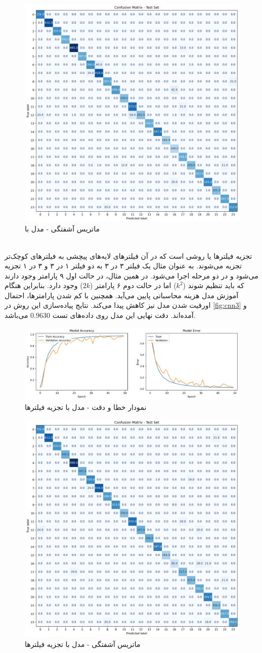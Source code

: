 \documentclass[11pt]{article}
\begin{document}
	\begin{figure}[!h]
		\centerline{\includegraphics[width=0.5\linewidth]{../HW3_2/cnn2 cm.png}}
		\caption{ماتریس آشفتگی - مدل  با }
		\label{fig:cnn2_cm} 
	\end{figure}\\
	تجزیه فیلتر‌ها یا  روشی است که در آن فیلتر‌های لایه‌های پیچشی به فیلتر‌های کوچک‌تر تجزیه می‌شوند. به عنوان مثال یک فیلتر ۳ در ۳ به دو فیلتر ۱ در ۳ و ۳ در ۱ تجزیه می‌شود و در دو مرحله اجرا می‌شود. در همین مثال، در حالت اول ۹ پارامتر وجود دارند که باید تنظیم شوند ($ k^2 $) اما در حالت دوم ۶ پارامتر ($2k$) وجود دارد. بنابراین هنگام آموزش مدل هزینه محاسباتی پایین می‌آید. همچنین با کم شدن پارامتر‌ها، احتمال اورفیت شدن مدل نیز کاهش پیدا می‌کند. نتایج پیاده‌سازی این روش در
	\autoref{fig:cnn3}
	و
	آمده‌اند. دقت نهایی این مدل روی داده‌های تست $0.9630$ می‌باشد.\\
		\begin{figure}[!h]
		\centerline{\includegraphics[width=1\linewidth]{../HW3_2/cnn3.png}}
		\caption{نمودار خطا و دقت  - مدل  با تجزیه فیلتر‌ها}
		\label{fig:cnn3}
	\end{figure}
	\begin{figure}[!h]
		\centerline{\includegraphics[width=0.5\linewidth]{../HW3_2/cnn3 cm.png}}
		\caption{ماتریس آشفتگی - مدل  با تجزیه فیلتر‌ها}
		\label{fig:cnn3_cm} 
	\end{figure}\\
\end{document}
